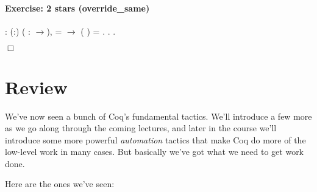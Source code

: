 \documentclass[12pt]{report}
\begin{document}
\paragraph{Exercise: 2 stars (override\_same)}

\begin{coqdoccode}
\coqdocnoindent
{}  : \coqdockw{\ensuremath{\forall}} (:)    ( : \ensuremath{\rightarrow}),\coqdoceol
\coqdocindent{1.00em}
  =  \ensuremath{\rightarrow} \coqdoceol
\coqdocindent{1.00em}
(   )  =  .\coqdoceol
\coqdocnoindent
{}.\coqdoceol
 .\coqdoceol
\end{coqdoccode}
\ensuremath{\Box} \begin{coqdoccode}
\coqdocemptyline
\end{coqdoccode}
\section{Review}



 We've now seen a bunch of Coq's fundamental tactics.  We'll
    introduce a few more as we go along through the coming lectures,
    and later in the course we'll introduce some more powerful
    \textit{automation} tactics that make Coq do more of the low-level work
    in many cases.  But basically we've got what we need to get work
    done.


    Here are the ones we've seen:
\end{document}
